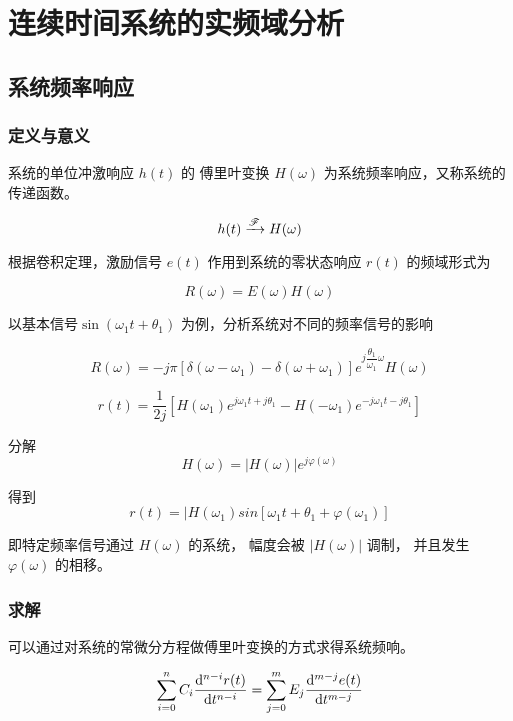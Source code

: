 \documentclass[cn,11pt,chinese,black,simple]{../elegantbook}
\begin{document}
\fi 

\chapter{连续时间系统的实频域分析}

\section{系统频率响应}

\subsection{定义与意义}

\begin{definition}[系统频率响应]
    系统的单位冲激响应 \(h(t)\) 的 傅里叶变换 \(H(\omega)\) 为系统频率响应，又称系统的传递函数。

    \[h(t) \xrightarrow{\mathscr{F}} H(\omega)\]
\end{definition}

根据卷积定理，激励信号 \(e(t)\) 作用到系统的零状态响应 \(r(t)\) 的频域形式为 

\[R(\omega) = E(\omega) H(\omega)\]

以基本信号\(\sin(\omega_1 t + \theta_1)\) 为例，分析系统对不同的频率信号的影响

\[R(\omega) = -j \pi \left[\delta(\omega - \omega_1) - \delta(\omega + \omega_1)\right] e^{ j \displaystyle\dfrac{\theta_1}{\omega_1} \omega} H(\omega) \]

\[r(t) = \dfrac{1}{2 j} \left[H(\omega_1) e^{j \omega_1 t + j \theta_1} - H(-\omega_1) e^{-j \omega_1 t - j\theta_1}\right]\]

分解 \[H(\omega) = |H(\omega)|e^{j \varphi(\omega)}\]

得到 \[r(t) = |H(\omega_1) sin\left[\omega_1 t + \theta_1 + \varphi(\omega_1)\right]\]

即特定频率信号通过 \(H(\omega)\) 的系统， 幅度会被 \(|H(\omega)|\) 调制， 并且发生 \(\varphi(\omega)\) 的相移。

\subsection{求解}

可以通过对系统的常微分方程做傅里叶变换的方式求得系统频响。


\[
\displaystyle\sum_{i=0}^{n} C_i \dfrac{\mathrm{d}^{n-i} r(t)}{\mathrm{d}t^{n-i}} = \displaystyle\sum_{j=0}^{m} E_j \dfrac{\mathrm{d}^{m-j} e(t)}{\mathrm{d}t^{m-j}} 
\]
\end{document}
